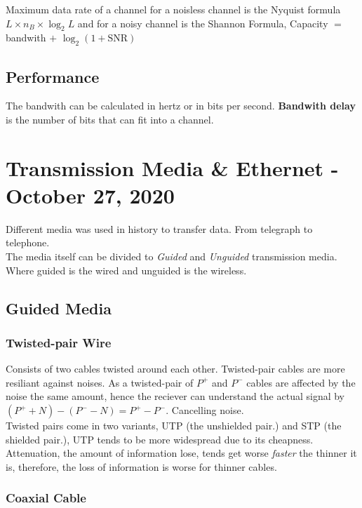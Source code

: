 \documentclass[11pt,a4paper,twoside]{book}
\begin{document}
Maximum data rate of a channel for a noisless channel is the Nyquist formula $L\times n_B \times \log_2 L$ \unsure and for a noisy channel is the Shannon Formula, Capacity $=$ bandwith $+$ $\log_2(1 + \text{SNR})$

\section{Performance}

The bandwith can be calculated in hertz or in bits per second. \textbf{Bandwith delay} is the number of bits that can fit into a channel.
\missed

\chapter{Transmission Media \& Ethernet - October 27, 2020}

Different media was used in history to transfer data. From telegraph to telephone.\\

The media itself can be divided to \textit{Guided} and \textit{Unguided} transmission media. Where guided is the wired and unguided is the wireless.

\section{Guided Media}

\subsection{Twisted-pair Wire}

Consists of two cables twisted around each other. Twisted-pair cables are more resiliant against noises. As a twisted-pair of $P^+$ and $P^-$ cables are affected by the noise the same amount, hence the reciever can understand the actual signal by $(P^+ + N) - (P^- - N) = P^+ - P^-$. Cancelling noise.\\

Twisted pairs come in two variants, UTP (the unshielded pair.) and STP (the shielded pair.), UTP tends to be more widespread due to its cheapness.\\

Attenuation, the amount of information lose, tends get worse \textit{faster} the thinner it is, therefore, the loss of information is worse for thinner cables.

\subsection{Coaxial Cable}
\end{document}
